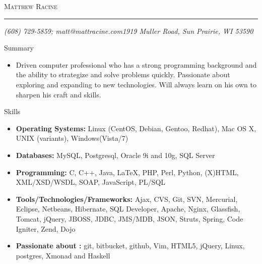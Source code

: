 \documentclass[11pt,oneside]{article}
\makeatletter
\newcommand{\name}{Matthew Racine}
\newcommand{\addr}{1919 Muller Road, Sun Prairie, WI 53590}
\newcommand{\phone}{(608) 729-5859}
\newcommand{\email}{matt@mattracine.com}
\newcommand{\bigname}[1]{
	\begin{center}\fontfamily{phv}\selectfont\Huge\scshape#1\end{center}
}
\newenvironment{ressection}[1]{
	\vspace{4pt}
	{\fontfamily{phv}\selectfont\Large#1}
	\begin{itemize}
	\vspace{3pt}
}{
	\end{itemize}
}
\newcommand{\resitem}[1]{
	\vspace{-4pt}
	\item \begin{flushleft} #1 \end{flushleft}
}
\makeatother
\begin{document}
 \selectfont

\bigname{\name}

\vspace{-8pt} \rule{\textwidth}{1pt}

\vspace{-1pt} {\small\itshape \phone ; \email \hfill \addr}

\vspace{8 pt}

\begin{ressection}{Summary} 
	\resitem{Driven computer professional who has a strong programming background and the ability to strategize and solve problems quickly.  Passionate about exploring and expanding to new technologies. Will always learn on his own to sharpen his craft and skills.}
\end{ressection}


\begin{ressection}{Skills}

	\resitem{\textbf{Operating Systems:} Linux (CentOS, Debian, Gentoo, Redhat), Mac OS X, UNIX (variants), Windows(Vista/7)}
	\resitem{\textbf{Databases:} MySQL, Postgresql, Oracle 9i and 10g, SQL Server}
	\resitem{\textbf{Programming:} C, C++, Java, \LaTeX, PHP, Perl, Python, (X)HTML, XML/XSD/WSDL, SOAP, JavaScript, PL/SQL}
	\resitem{\textbf{Tools/Technologies/Frameworks:} Ajax, CVS, Git, SVN, Mercurial, Eclipse, Netbeans, Hibernate, SQL Developer, Apache, Nginx, Glassfish, Tomcat, jQuery, JBOSS, JDBC, JMS/MDB, JSON, Struts, Spring, Code Igniter, Zend, Dojo}
	\resitem{\textbf{Passionate about :} git, bitbucket, github, Vim, HTML5, jQuery, Linux, postgres, Xmonad and Haskell}

\end{ressection}
\end{document}
